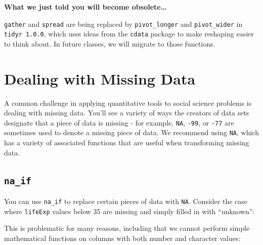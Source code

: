 \documentclass[]{book}
\newenvironment{Shaded}{\begin{snugshade}}{\end{snugshade}}
\newcommand{\KeywordTok}[1]{\textcolor[rgb]{0.13,0.29,0.53}{\textbf{#1}}}
\newcommand{\DataTypeTok}[1]{\textcolor[rgb]{0.13,0.29,0.53}{#1}}
\newcommand{\DecValTok}[1]{\textcolor[rgb]{0.00,0.00,0.81}{#1}}
\newcommand{\StringTok}[1]{\textcolor[rgb]{0.31,0.60,0.02}{#1}}
\newcommand{\CommentTok}[1]{\textcolor[rgb]{0.56,0.35,0.01}{\textit{#1}}}
\newcommand{\OtherTok}[1]{\textcolor[rgb]{0.56,0.35,0.01}{#1}}
\newcommand{\OperatorTok}[1]{\textcolor[rgb]{0.81,0.36,0.00}{\textbf{#1}}}
\newcommand{\NormalTok}[1]{#1}
\begin{document}
\textbf{What we just told you will become obsolete\ldots{}}

\texttt{gather} and \texttt{spread} are being replaced by
\texttt{pivot\_longer} and \texttt{pivot\_wider} in
\texttt{tidyr\ 1.0.0}, which uses ideas from the \texttt{cdata} package
to make reshaping easier to think about. In future classes, we will
migrate to those functions.

\section{Dealing with Missing Data}\label{dealing-with-missing-data}

A common challenge in applying quantitative tools to social science
problems is dealing with missing data. You'll see a variety of ways the
creators of data sets designate that a piece of data is missing - for
example, \texttt{NA}, \texttt{-99}, or \texttt{-77} are sometimes used
to denote a missing piece of data. We recommend using \texttt{NA}, which
has a variety of associated functions that are useful when transforming
missing data.

\subsection{\texorpdfstring{\texttt{na\_if}}{na\_if}}\label{na_if}

You can use \texttt{na\_if} to replace certain pieces of data with
\texttt{NA}. Consider the case where \texttt{lifeExp} values below 35
are missing and simply filled in with ``unknown'':

\begin{Shaded}
\end{Shaded}

This is problematic for many reasons, including that we cannot perform
simple mathematical functions on columns with both number and character
values:

\begin{Shaded}
\end{Shaded}
\end{document}
